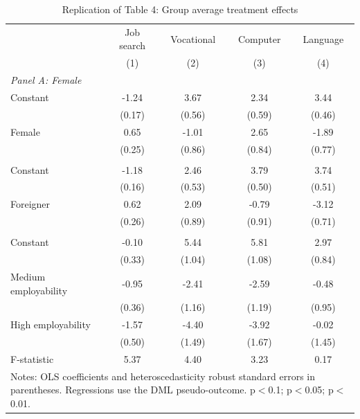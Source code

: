 \begin{table}[h]
\centering
\caption{Replication of Table 4: Group average treatment effects}
\small
\begin{tabular}{lcccc}
\toprule
 & Job search & Vocational & Computer & Language \\
 & (1) & (2) & (3) & (4) \\
\midrule
\multicolumn{5}{l}{\textit{Panel A: Female}} \\
Constant & -1.24\sym{*}\sym{*}\sym{*} & 3.67\sym{*}\sym{*}\sym{*} & 2.34\sym{*}\sym{*}\sym{*} & 3.44\sym{*}\sym{*}\sym{*} \\
 & (0.17) & (0.56) & (0.59) & (0.46) \\
Female & 0.65\sym{*}\sym{*} & -1.01 & 2.65\sym{*}\sym{*}\sym{*} & -1.89\sym{*}\sym{*} \\
 & (0.25) & (0.86) & (0.84) & (0.77) \\
\addlinespace
\multicolumn{5}{l}{\textit{Panel B: Foreigner}} \\
Constant & -1.18\sym{*}\sym{*}\sym{*} & 2.46\sym{*}\sym{*}\sym{*} & 3.79\sym{*}\sym{*}\sym{*} & 3.74\sym{*}\sym{*}\sym{*} \\
 & (0.16) & (0.53) & (0.50) & (0.51) \\
Foreigner & 0.62\sym{*}\sym{*} & 2.09\sym{*}\sym{*} & -0.79 & -3.12\sym{*}\sym{*}\sym{*} \\
 & (0.26) & (0.89) & (0.91) & (0.71) \\
\addlinespace
\multicolumn{5}{l}{\textit{Panel C: Employability}} \\
Constant & -0.10 & 5.44\sym{*}\sym{*}\sym{*} & 5.81\sym{*}\sym{*}\sym{*} & 2.97\sym{*}\sym{*}\sym{*} \\
 & (0.33) & (1.04) & (1.08) & (0.84) \\
Medium employability & -0.95\sym{*}\sym{*}\sym{*} & -2.41\sym{*}\sym{*} & -2.59\sym{*}\sym{*} & -0.48 \\
 & (0.36) & (1.16) & (1.19) & (0.95) \\
High employability & -1.57\sym{*}\sym{*}\sym{*} & -4.40\sym{*}\sym{*}\sym{*} & -3.92\sym{*}\sym{*} & -0.02 \\
 & (0.50) & (1.49) & (1.67) & (1.45) \\
F-statistic & 5.37\sym{*}\sym{*}\sym{*} & 4.40\sym{*}\sym{*} & 3.23\sym{*}\sym{*} & 0.17 \\
\bottomrule
\multicolumn{5}{p{0.90\textwidth}}{\footnotesize Notes: OLS coefficients and heteroscedasticity robust standard errors in parentheses. Regressions use the DML pseudo-outcome. \sym{*} p$<$0.1; \sym{**} p$<$0.05; \sym{***} p$<$0.01.} \\
\end{tabular}
\label{tab:table4}
\end{table}

